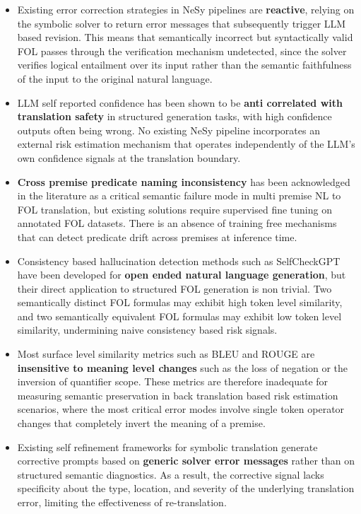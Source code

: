 \begin{itemize}

    \item Existing error correction strategies in NeSy pipelines are  \textbf{reactive}, relying on the symbolic solver to return error messages that subsequently trigger LLM based revision. This means that semantically incorrect but syntactically valid FOL passes through the verification mechanism undetected, since the solver verifies logical entailment over its input rather than the semantic faithfulness of the input to the original natural language.

    \item LLM self reported confidence has been shown to be \textbf{anti correlated with translation safety} in structured generation tasks, with high confidence outputs often being wrong. No existing NeSy pipeline incorporates an external risk estimation mechanism that operates independently of the LLM's own confidence signals at the translation boundary.

    \item \textbf{Cross premise predicate naming inconsistency} has been acknowledged in the literature as a critical semantic failure mode in multi premise NL to FOL translation, but existing solutions require supervised fine tuning on annotated FOL datasets. There is an absence of training free mechanisms that can detect predicate drift across premises at inference time.

    \item Consistency based hallucination detection methods such as SelfCheckGPT have been developed for \textbf{open ended natural language generation}, but their direct application to structured FOL generation is non trivial. Two semantically distinct FOL formulas may exhibit high token level similarity, and two semantically equivalent FOL formulas may exhibit low token level similarity, undermining naive consistency based risk signals.

    \item Most surface level similarity metrics such as BLEU and ROUGE are \textbf{insensitive to meaning level changes} such as the loss of negation or the inversion of quantifier scope. These metrics are therefore inadequate for measuring semantic preservation in back translation based risk estimation scenarios, where the most critical error modes involve single token operator changes that completely invert the meaning of a premise.

    \item Existing self refinement frameworks for symbolic translation generate corrective prompts based on \textbf{generic solver error messages} rather than on structured semantic diagnostics. As a result, the corrective signal lacks specificity about the type, location, and severity of the underlying translation error, limiting the effectiveness of re-translation.


\end{itemize}
